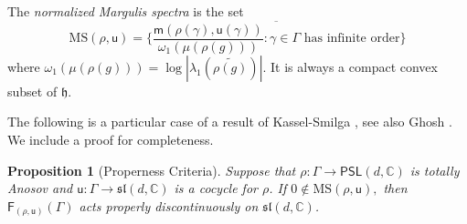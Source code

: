 \documentclass{amsart}
\theoremstyle{plain}
\newtheorem{proposition}{Proposition}[section]
\theoremstyle{definition}
\theoremstyle{remark}
\newcommand{\PSL}{\mathsf{PSL}}
\newcommand{\aff}[1]{\sf{F}_{#1}}
\renewcommand{\sf}[1]{{\mathsf{#1}}}
\newcommand{\h}{{\mathfrak h}}
\newcommand{\C}{\mathbb C}
\renewcommand{\sl}{\mathfrak{sl}}
\newcommand{\<}{\left <}
\renewcommand{\>}{\right >}
\newcommand{\G}{\Gamma}
\newcommand{\g}{\gamma}
\newcommand{\M}{\mathrm{MS}}
\newcommand{\co}{\sf u}
\renewcommand{\C}{\mathbb C}
\begin{document}
The  {\em normalized Margulis spectra} is the set 
$$\M(\rho,\co)=\overline{\Big\{\frac{\sf m(\rho(\g),\co(\g))}{\omega_1(\mu(\rho(g)))} :\g\in\G \text{ has infinite order}\Big\}}$$ 
where $\omega_1(\mu(\rho(g)))= \log|\lambda_1(\widetilde{\rho(g)})|$. 
It is always a compact convex subset of $\h.$


The following is a particular case of a result of  Kassel-Smilga \cite{KS}, see also Ghosh \cite{Ghoshdef}. We include a proof for completeness. 

\begin{proposition}[Properness Criteria]\label{notzero} 
Suppose that $\rho:\Gamma\to\PSL(d,\mathbb C)$ is totally Anosov and $\co:\Gamma\to\sl(d,\C)$ is a cocycle for $\rho$.
If $0\notin\M(\rho,\co),$ then $\aff{(\rho,\co)}(\G)$ acts properly discontinuously on $\sl(d,\C)$.
\end{proposition}
\end{document}
